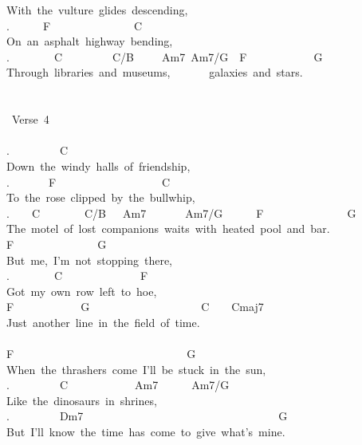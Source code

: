 {With\ the\ vulture\ glides\ descending,\\
.\ \ \ \ \ \ F\ \ \ \ \ \ \ \ \ \ \ \ \ \ \ C\ \ \\
On\ an\ asphalt\ highway\ bending,\\
.\ \ \ \ \ \ \ \ C\ \ \ \ \ \ \ \ \ C/B\ \ \ \ \ Am7\ Am7/G\ \ F\ \ \ \ \ \ \ \ \ \ \ \ G\ \\
Through\ libraries\ and\ museums,\ \ \ \ \ \ \ galaxies\ and\ stars.\\
\\
\\
\lbrack\ Verse\ 4\rbrack\\
\\
.\ \ \ \ \ \ \ \ \ C\\
Down\ the\ windy\ halls\ of\ friendship,\\
.\ \ \ \ \ \ \ F\ \ \ \ \ \ \ \ \ \ \ \ \ \ \ \ \ \ \ C\ \\
To\ the\ rose\ clipped\ by\ the\ bullwhip,\\
.\ \ \ \ C\ \ \ \ \ \ \ \ C/B\ \ \ Am7\ \ \ \ \ \ \ Am7/G\ \ \ \ \ \ F\ \ \ \ \ \ \ \ \ \ \ \ \ \ \ G\ \ \\
The\ motel\ of\ lost\ companions\ waits\ with\ heated\ pool\ and\ bar.\\
F\ \ \ \ \ \ \ \ \ \ \ \ \ \ \ G\\
But\ me,\ I'm\ not\ stopping\ there,\\
.\ \ \ \ \ \ \ \ C\ \ \ \ \ \ \ \ \ \ \ \ \ \ F\ \\
Got\ my\ own\ row\ left\ to\ hoe,\\
F\ \ \ \ \ \ \ \ \ \ \ \ G\ \ \ \ \ \ \ \ \ \ \ \ \ \ \ \ \ \ \ \ C\ \ \ \ Cmaj7\\
Just\ another\ line\ in\ the\ field\ of\ time.\\
\\
F\ \ \ \ \ \ \ \ \ \ \ \ \ \ \ \ \ \ \ \ \ \ \ \ \ \ \ \ \ \ \ G\ \\
When\ the\ thrashers\ come\ I'll\ be\ stuck\ in\ the\ sun,\\
.\ \ \ \ \ \ \ \ \ C\ \ \ \ \ \ \ \ \ \ \ \ Am7\ \ \ \ \ \ Am7/G\ \\
Like\ the\ dinosaurs\ in\ shrines,\\
.\ \ \ \ \ \ \ \ \ Dm7\ \ \ \ \ \ \ \ \ \ \ \ \ \ \ \ \ \ \ \ \ \ \ \ \ \ \ \ \ \ \ \ \ \ \ G\\
But\ I'll\ know\ the\ time\ has\ come\ to\ give\ what's\ mine.}
